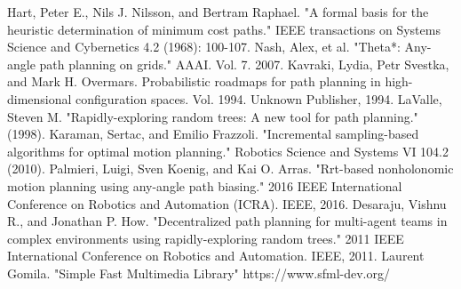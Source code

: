 \documentclass[journal]{IEEEtran}
\begin{document}


%
%
%
\begin{thebibliography}{1}
Hart, Peter E., Nils J. Nilsson, and Bertram Raphael. "A formal basis for the heuristic determination of minimum cost paths." IEEE transactions on Systems Science and Cybernetics 4.2 (1968): 100-107.
Nash, Alex, et al. "Theta*: Any-angle path planning on grids." AAAI. Vol. 7. 2007.
Kavraki, Lydia, Petr Svestka, and Mark H. Overmars. Probabilistic roadmaps for path planning in high-dimensional configuration spaces. Vol. 1994. Unknown Publisher, 1994.
LaValle, Steven M. "Rapidly-exploring random trees: A new tool for path planning." (1998).
Karaman, Sertac, and Emilio Frazzoli. "Incremental sampling-based algorithms for optimal motion planning." Robotics Science and Systems VI 104.2 (2010).
Palmieri, Luigi, Sven Koenig, and Kai O. Arras. "Rrt-based nonholonomic motion planning using any-angle path biasing." 2016 IEEE International Conference on Robotics and Automation (ICRA). IEEE, 2016.
Desaraju, Vishnu R., and Jonathan P. How. "Decentralized path planning for multi-agent teams in complex environments using rapidly-exploring random trees." 2011 IEEE International Conference on Robotics and Automation. IEEE, 2011.
Laurent Gomila. "Simple Fast Multimedia Library" https://www.sfml-dev.org/
\end{thebibliography}





\end{document}
